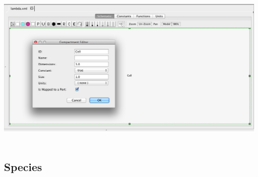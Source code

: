 \documentclass[titlepage,11pt]{article}
\begin{document}
\begin{center}
\includegraphics[height=80mm]{screenshots/compartment}
\end{center}

\subsection{\label{Species}Species}
\end{document}
